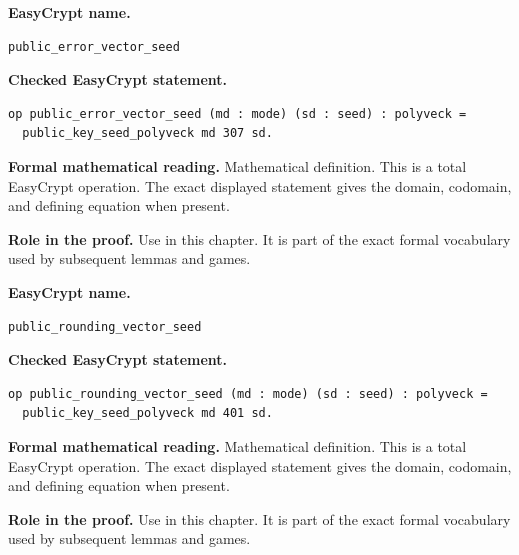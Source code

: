 \begin{formaldefinition}
\noindent\textbf{EasyCrypt name.}
\begin{lstlisting}[language=EasyCrypt,basicstyle=\ttfamily\scriptsize]
public_error_vector_seed
\end{lstlisting}
\noindent\textbf{Checked EasyCrypt statement.}
\begin{lstlisting}[language=EasyCrypt,basicstyle=\ttfamily\scriptsize]
op public_error_vector_seed (md : mode) (sd : seed) : polyveck =
  public_key_seed_polyveck md 307 sd.
\end{lstlisting}
\noindent\textbf{Formal mathematical reading.}
Mathematical definition. This is a total EasyCrypt operation.  The exact displayed statement gives the domain, codomain, and defining equation when present.

\noindent\textbf{Role in the proof.}
Use in this chapter. It is part of the exact formal vocabulary used by subsequent lemmas and games.

\end{formaldefinition}

\begin{formaldefinition}
\noindent\textbf{EasyCrypt name.}
\begin{lstlisting}[language=EasyCrypt,basicstyle=\ttfamily\scriptsize]
public_rounding_vector_seed
\end{lstlisting}
\noindent\textbf{Checked EasyCrypt statement.}
\begin{lstlisting}[language=EasyCrypt,basicstyle=\ttfamily\scriptsize]
op public_rounding_vector_seed (md : mode) (sd : seed) : polyveck =
  public_key_seed_polyveck md 401 sd.
\end{lstlisting}
\noindent\textbf{Formal mathematical reading.}
Mathematical definition. This is a total EasyCrypt operation.  The exact displayed statement gives the domain, codomain, and defining equation when present.

\noindent\textbf{Role in the proof.}
Use in this chapter. It is part of the exact formal vocabulary used by subsequent lemmas and games.

\end{formaldefinition}

